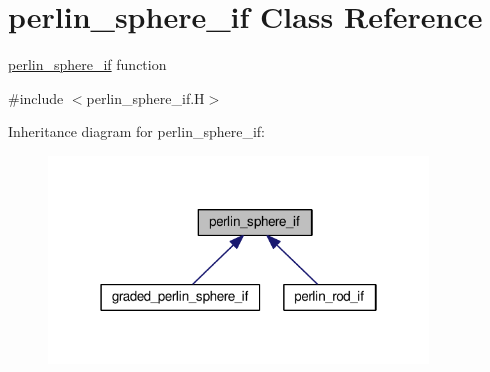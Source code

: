 \hypertarget{classperlin__sphere__if}{}\section{perlin\+\_\+sphere\+\_\+if Class Reference}
\label{classperlin__sphere__if}


\hyperlink{classperlin__sphere__if}{perlin\+\_\+sphere\+\_\+if} function  




{\ttfamily \#include $<$perlin\+\_\+sphere\+\_\+if.\+H$>$}



Inheritance diagram for perlin\+\_\+sphere\+\_\+if\+:\nopagebreak
\begin{figure}[H]
\begin{center}
\leavevmode
\includegraphics[width=286pt]{classperlin__sphere__if__inherit__graph}
\end{center}
\end{figure}
